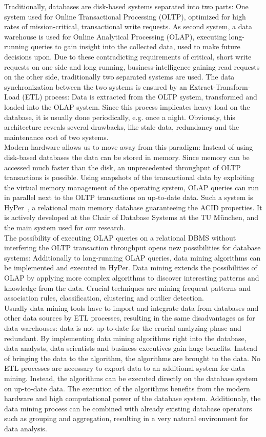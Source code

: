 Traditionally, databases are disk-based systems separated into two parts: One system used for Online Transactional Processing (OLTP), optimized for high rates of mission-critical, transactional write requests. As second system, a data warehouse is used for Online Analytical Processing (OLAP), executing long-running queries to gain insight into the  collected data, used to make future decisions upon. Due to these contradicting requirements of critical, short write requests on one side and long running, business-intelligence gaining read requests on the other side, traditionally two separated systems are used. The data synchronization between the two systems is ensured by an Extract-Transform-Load (ETL) process: Data is extracted from the OLTP system, transformed and loaded into the OLAP system. Since this process implicates heavy load on the database, it is usually done periodically, e.g. once a night. Obviously, this architecture reveals several drawbacks, like stale data, redundancy and the maintenance cost of two systems.
\\
Modern hardware allows us to move away from this paradigm: Instead of using disk-based databases the data can be stored in memory. Since memory can be accessed much faster than the disk, an unprecedented throughput of OLTP transactions is possible. Using snapshots of the transactional data by exploiting the virtual memory management of the operating system, OLAP queries can run in parallel next to the OLTP transactions on up-to-date data. Such a system is HyPer~\parencite{5767867}, a relational main memory database guaranteeing the ACID properties. It is actively developed at the Chair of Database Systems at the TU München, and the main system used for our research. 
\\
The possibility of executing OLAP queries on a relational DBMS without interfering the OLTP transaction throughput opens new possibilities for database systems: Additionally to long-running OLAP queries, data mining algorithms can be implemented and executed in HyPer. Data mining extends the possibilities of OLAP by applying more complex algorithms to discover interesting patterns and knowledge from the data. Crucial techniques are mining frequent patterns and association rules, classification, clustering and outlier detection.
\\
Usually data mining tools have to import and integrate data from databases and other data sources by ETL processes, resulting in the same disadvantages as for data warehouses: data is not up-to-date for the crucial analyzing phase and redundant. 
By implementing data mining algorithms right into the database, data analysts, data scientists and business executives gain huge benefits. Instead of bringing the data to the algorithm, the algorithms are brought to the data. No ETL processes are necessary to export data to an additional system for data mining. Instead, the algorithms can be executed directly on the database system on up-to-date data. The execution of the algorithms benefits from the modern hardware and high computational power of the database system. Additionaly, the data mining process can be combined with already existing database operators such as grouping and aggregation, resulting in a very natural environment for data analysis.


